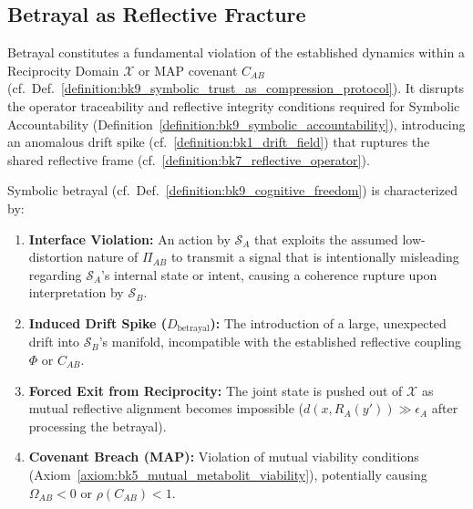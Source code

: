 \subsection{Betrayal as Reflective Fracture}
\label{subsec:bk9_betrayal_as_reflective_fracture}
Betrayal constitutes a fundamental violation of the established dynamics within a Reciprocity Domain $\mathcal{X}$ or MAP covenant $C_{AB}$ (cf.~Def.~\ref{definition:bk9_symbolic_trust_as_compression_protocol}). It disrupts the operator traceability and reflective integrity conditions required for Symbolic Accountability (Definition~\ref{definition:bk9_symbolic_accountability}), introducing an anomalous drift spike (cf.~\ref{definition:bk1_drift_field}) that ruptures the shared reflective frame (cf.~\ref{definition:bk7_reflective_operator}).
\begin{definition}
\label{definition:bk9_formal_signature_of_betrayal}
Symbolic betrayal (cf.~Def.~\ref{definition:bk9_cognitive_freedom}) is characterized by:
\begin{enumerate}
    \item \textbf{Interface Violation:} An action by $\mathcal{S}_A$ that exploits the assumed low-distortion nature of $\Pi_{AB}$ to transmit a signal that is intentionally misleading regarding $\mathcal{S}_A$'s internal state or intent, causing a coherence rupture upon interpretation by $\mathcal{S}_B$.
    \item \textbf{Induced Drift Spike ($D_{\text{betrayal}}$):} The introduction of a large, unexpected drift into $\mathcal{S}_B$'s manifold, incompatible with the established reflective coupling $\Phi$ or $C_{AB}$.
    \item \textbf{Forced Exit from Reciprocity:} The joint state is pushed out of $\mathcal{X}$ as mutual reflective alignment becomes impossible ($d(x, R_A(y')) \gg \epsilon_A$ after processing the betrayal).
        \item \textbf{Covenant Breach (MAP):} Violation of mutual viability conditions (Axiom~\ref{axiom:bk5_mutual_metabolit_viability}), potentially causing $\Omega_{AB} < 0$ or $\rho(C_{AB}) < 1$.
     
\end{enumerate}
\end{definition}
